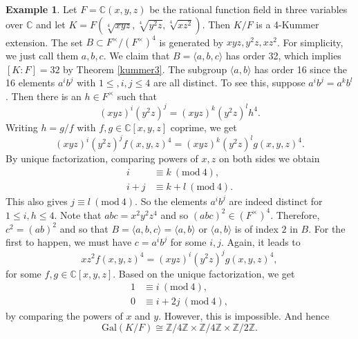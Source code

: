 \documentclass[12pt]{report}
\theoremstyle{definition}
\newtheorem{example}[theorem]{Example}
\newcommand{\Mod}[1]{\ (\mathrm{mod}\ #1)}
\newcommand{\gal}{\text{Gal}}
\newcommand{\cc}{\mathbb{C}}
\newcommand{\zz}{\mathbb{Z}}
\newcommand{\ta}[1]{\langle #1 \rangle}
\begin{document}
\begin{example}
	Let $F=\cc(x,y,z)$ be the rational function field in three variables over $\cc$ and let $K=F(\sqrt[4]{xyz},\sqrt[4]{y^2z},\sqrt[4]{xz^2})$. Then $K/F$ is a 4-Kummer extension. The set $B\subset F^\times/(F^\times)^4$ is generated by $xyz,y^2z,xz^2$. For simplicity, we just call them $a,b,c$. We claim that $B=\ta{a,b,c}$ has order 32, which implies $[K:F]=32$ by Theorem \ref{kummer3}. The subgroup $\ta{a,b}$ has order 16 since the 16 elements $a^ib^j$ with $1\leq,i,j\leq 4$ are all distinct. To see this, suppose $a^ib^j=a^kb^l$. Then there is an $h\in F^\times$ such that
	$$(xyz)^i(y^2z)^j=(xyz)^k(y^2z)^lh^4.$$
	Writing $h=g/f$ with $f,g\in \cc[x,y,z]$ coprime, we get
	$$(xyz)^i(y^2z)^jf(x,y,z)^4=(xyz)^k(y^2z)^lg(x,y,z)^4.$$
	By unique factorization, comparing powers of $x,z$ on both sides we obtain \begin{align*}
		i   & \equiv k\Mod{4},   \\
		i+j & \equiv k+l\Mod{4}.
	\end{align*}
	This also gives $j\equiv l\Mod{4}$. So the elements $a^ib^j$ are indeed distinct for $1\leq i,h\leq 4$. Note that $abc=x^2y^2z^4$ and so $(abc)^2\in (F^\times)^4$. Therefore, $c^2=(ab)^2$ and so that $B=\ta{a,b,c}=\ta{a,b}$ or $\ta{a,b}$ is of index $2$ in $B$. For the first to happen, we must have $c=a^ib^j$ for some $i,j$. Again, it leads to $$xz^2f(x,y,z)^4=(xyz)^i(y^2z)^jg(x,y,z)^4,$$ for some $f,g\in \cc[x,y,z]$. Based on the unique factorization, we get \begin{align*}
		1 & \equiv i\Mod{4},    \\
		0 & \equiv i+2j\Mod{4},
	\end{align*}
	by comparing the powers of $x$ and $y$. However, this is impossible. And hence $$\gal(K/F)\cong \zz/4\zz\times\zz/4\zz\times\zz/2\zz.$$
\end{example}
\end{document}

